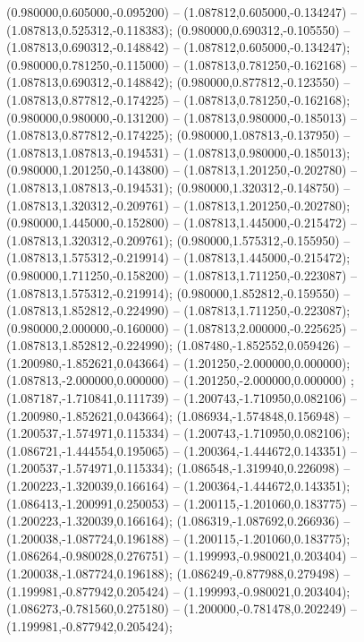  (0.980000,0.605000,-0.095200) -- (1.087812,0.605000,-0.134247) -- (1.087813,0.525312,-0.118383);
 (0.980000,0.690312,-0.105550) -- (1.087813,0.690312,-0.148842) -- (1.087812,0.605000,-0.134247);
 (0.980000,0.781250,-0.115000) -- (1.087813,0.781250,-0.162168) -- (1.087813,0.690312,-0.148842);
 (0.980000,0.877812,-0.123550) -- (1.087813,0.877812,-0.174225) -- (1.087813,0.781250,-0.162168);
 (0.980000,0.980000,-0.131200) -- (1.087813,0.980000,-0.185013) -- (1.087813,0.877812,-0.174225);
 (0.980000,1.087813,-0.137950) -- (1.087813,1.087813,-0.194531) -- (1.087813,0.980000,-0.185013);
 (0.980000,1.201250,-0.143800) -- (1.087813,1.201250,-0.202780) -- (1.087813,1.087813,-0.194531);
 (0.980000,1.320312,-0.148750) -- (1.087813,1.320312,-0.209761) -- (1.087813,1.201250,-0.202780);
 (0.980000,1.445000,-0.152800) -- (1.087813,1.445000,-0.215472) -- (1.087813,1.320312,-0.209761);
 (0.980000,1.575312,-0.155950) -- (1.087813,1.575312,-0.219914) -- (1.087813,1.445000,-0.215472);
 (0.980000,1.711250,-0.158200) -- (1.087813,1.711250,-0.223087) -- (1.087813,1.575312,-0.219914);
 (0.980000,1.852812,-0.159550) -- (1.087813,1.852812,-0.224990) -- (1.087813,1.711250,-0.223087);
 (0.980000,2.000000,-0.160000) -- (1.087813,2.000000,-0.225625) -- (1.087813,1.852812,-0.224990);
 (1.087480,-1.852552,0.059426) -- (1.200980,-1.852621,0.043664) -- (1.201250,-2.000000,0.000000);
 (1.087813,-2.000000,0.000000) -- (1.201250,-2.000000,0.000000) ;
 (1.087187,-1.710841,0.111739) -- (1.200743,-1.710950,0.082106) -- (1.200980,-1.852621,0.043664);
 (1.086934,-1.574848,0.156948) -- (1.200537,-1.574971,0.115334) -- (1.200743,-1.710950,0.082106);
 (1.086721,-1.444554,0.195065) -- (1.200364,-1.444672,0.143351) -- (1.200537,-1.574971,0.115334);
 (1.086548,-1.319940,0.226098) -- (1.200223,-1.320039,0.166164) -- (1.200364,-1.444672,0.143351);
 (1.086413,-1.200991,0.250053) -- (1.200115,-1.201060,0.183775) -- (1.200223,-1.320039,0.166164);
 (1.086319,-1.087692,0.266936) -- (1.200038,-1.087724,0.196188) -- (1.200115,-1.201060,0.183775);
 (1.086264,-0.980028,0.276751) -- (1.199993,-0.980021,0.203404) -- (1.200038,-1.087724,0.196188);
 (1.086249,-0.877988,0.279498) -- (1.199981,-0.877942,0.205424) -- (1.199993,-0.980021,0.203404);
 (1.086273,-0.781560,0.275180) -- (1.200000,-0.781478,0.202249) -- (1.199981,-0.877942,0.205424);
